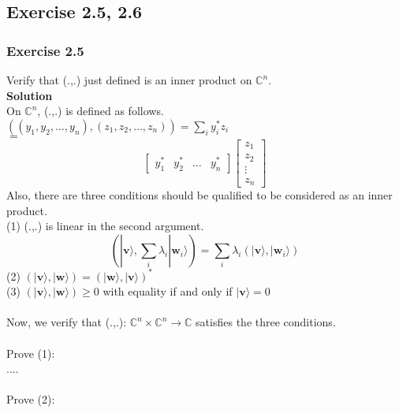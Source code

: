 \documentclass{article}
\begin{document}
\subsection{Exercise 2.5, 2.6}
\subsubsection{Exercise 2.5}
Verify that (.,.) just defined is an inner product on $\mathbb{C}^n$. \\ 

\textbf{Solution} \\
On $\mathbb{C}^n$, (.,.) is defined as follows. \\
$((y_1, y_2, \ldots, y_n), (z_1, z_2, \ldots, z_n)) = \sum_{i} y_i^* z_i$ \\
$=$
\begin{equation}
    \begin{bmatrix}
        y_1^* & y_2^* & \ldots & y_n^*
    \end{bmatrix}
    \begin{bmatrix}
        z_1 \\
        z_2 \\
        \vdots \\
        z_n
    \end{bmatrix}
\end{equation}
Also, there are three conditions should be qualified to be considered as an inner product. \\
(1) (.,.) is linear in the second argument. \\
    \begin{equation}
        (|\mathbf{v}\rangle, \sum_i \lambda_i |\mathbf{w}_i\rangle) = \sum_i \lambda_i (|\mathbf{v}\rangle, |\mathbf{w}_i\rangle)
    \end{equation}
(2) $(|\mathbf{v}\rangle, |\mathbf{w}\rangle) = (|\mathbf{w}\rangle, |\mathbf{v}\rangle)^*$ \\
(3) $(|\mathbf{v}\rangle, |\mathbf{w}\rangle) \geq 0$ with equality if and only if $|\mathbf{v}\rangle = 0$ \\ \\
Now, we verify that (.,.): $\mathbb{C}^n \times \mathbb{C}^n \rightarrow \mathbb{C}$ satisfies the three conditions. \\ \\
Prove (1): \\
.... \\ \\
Prove (2): \\
\end{document}
